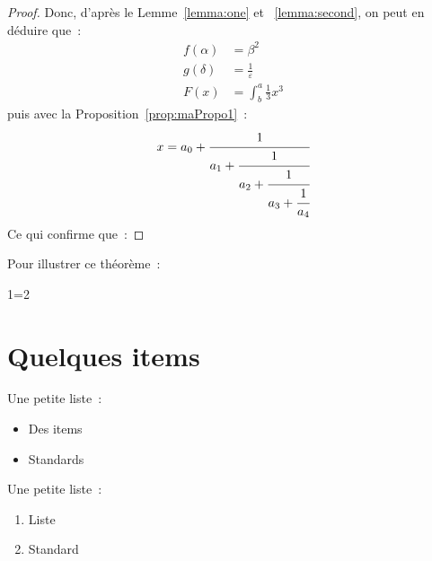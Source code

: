 \begin{proof}
Donc, d'après le Lemme~\ref{lemma:one} et ~\ref{lemma:second}, on peut en déduire que~:
\begin{align*}
  f(\alpha) &= \beta^2\\
  g(\delta) &= \frac{1}{\varepsilon}\\
  F(x) &= \int^a_b \frac{1}{3}x^3
\end{align*}
puis avec la Proposition~\ref{prop:maPropo1}~:
\begin{equation}
  x = a_0 + \cfrac{1}{a_1 
          + \cfrac{1}{a_2 
          + \cfrac{1}{a_3 + \cfrac{1}{a_4} } } }
\end{equation}
Ce qui confirme que~:

\end{proof}

\lipsum[12] 

\noindent Pour illustrer ce théorème~:
\begin{example}
1=2
\end{example}

\section{Quelques items}
\label{sec:one:two}

\lipsum[13]

\noindent Une petite liste~:
\begin{itemize}
\item Des items
\item Standards
\end{itemize}

\noindent Une petite liste~:
\begin{enumerate}
\item Liste
\item Standard
\end{enumerate}

